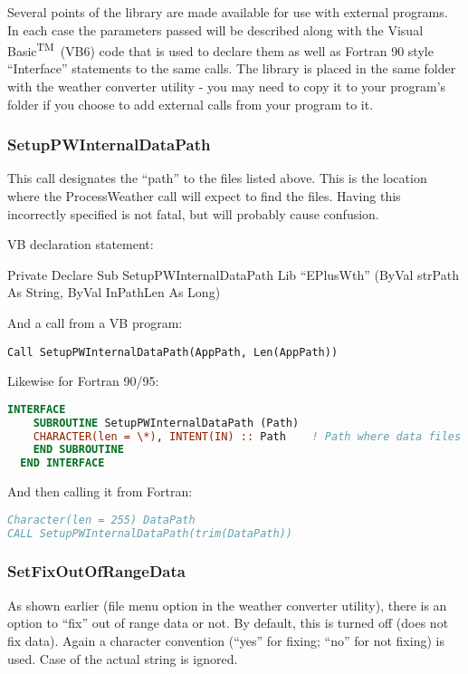 Several points of the library are made available for use with external programs. In each case the parameters passed will be described along with the Visual Basic\textsuperscript{TM}\ (VB6) code that is used to declare them as well as Fortran 90 style ``Interface'' statements to the same calls. The library is placed in the same folder with the weather converter utility - you may need to copy it to your program's folder if you choose to add external calls from your program to it.

\subsubsection{SetupPWInternalDataPath}\label{setuppwinternaldatapath}

This call designates the ``path'' to the files listed above. This is the location where the ProcessWeather call will expect to find the files. Having this incorrectly specified is not fatal, but will probably cause confusion.

VB declaration statement:

Private Declare Sub SetupPWInternalDataPath Lib ``EPlusWth'' (ByVal strPath As String, ByVal InPathLen As Long)

And a call from a VB program:

\begin{lstlisting}
Call SetupPWInternalDataPath(AppPath, Len(AppPath))
\end{lstlisting}

Likewise for Fortran 90/95:

\begin{lstlisting}[language=Fortran]
  INTERFACE
    SUBROUTINE SetupPWInternalDataPath (Path)
    CHARACTER(len = \*), INTENT(IN) :: Path    ! Path where data files reside
    END SUBROUTINE
  END INTERFACE
\end{lstlisting}

And then calling it from Fortran:

\begin{lstlisting}[language=Fortran]
Character(len = 255) DataPath
CALL SetupPWInternalDataPath(trim(DataPath))
\end{lstlisting}

\subsubsection{SetFixOutOfRangeData}\label{setfixoutofrangedata}

As shown earlier (file menu option in the weather converter utility), there is an option to ``fix'' out of range data or not. By default, this is turned off (does not fix data). Again a character convention (``yes'' for fixing; ``no'' for not fixing) is used. Case of the actual string is ignored.

